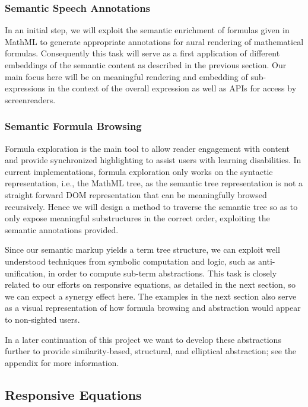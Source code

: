 \documentclass[12pt]{amsart}
\begin{document}
\subsubsection*{Semantic Speech Annotations}

In an initial step, we will exploit the semantic enrichment of formulas given in 
MathML to generate appropriate annotations for aural rendering of mathematical 
formulas. Consequently this task will serve as a first application of different 
embeddings of the semantic content as described in the previous section. Our 
main focus here will be on meaningful rendering and embedding of 
sub-expressions in the context of the overall expression as well as APIs for 
access by screenreaders.

\subsubsection*{Semantic Formula Browsing}

Formula exploration is the main tool to allow reader engagement with content 
and provide synchronized highlighting to assist users with learning 
disabilities. In current implementations, formula exploration only works on the syntactic 
representation, i.e., the MathML tree, as the semantic tree representation is not 
a straight forward DOM representation that can be meaningfully browsed 
recursively. Hence we will design a method to traverse the semantic tree so as to 
only expose meaningful substructures in the correct order, exploiting the 
semantic annotations provided. 


Since our semantic markup yields a term tree structure, we can exploit well
understood techniques from symbolic computation and logic, such as
anti-unification, in order to compute sub-term abstractions. This 
task is closely related to our efforts on responsive equations, as detailed
in the next section, so we can expect a synergy effect here. The examples in 
the next section also serve as a visual representation of how formula 
browsing and abstraction would appear to non-sighted users.

In a later continuation of this project we want to develop these abstractions 
further to provide similarity-based, structural, and elliptical abstraction;
see the appendix for more information.


\subsection{Responsive Equations}
\end{document}
